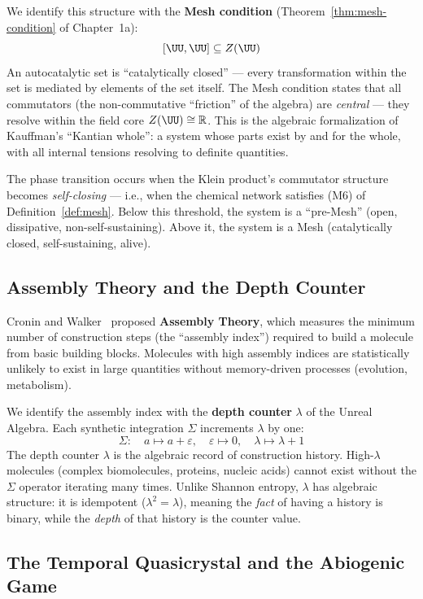 We identify this structure with the \textbf{Mesh condition} (Theorem~\ref{thm:mesh-condition} of Chapter~1a):
$$[\UU, \UU] \subseteq Z(\UU)$$
An autocatalytic set is ``catalytically closed'' --- every transformation within the set is mediated by elements of the set itself. The Mesh condition states that all commutators (the non-commutative ``friction'' of the algebra) are \emph{central} --- they resolve within the field core $Z(\UU) \cong \mathbb{R}$. This is the algebraic formalization of Kauffman's ``Kantian whole'': a system whose parts exist by and for the whole, with all internal tensions resolving to definite quantities.

The phase transition occurs when the Klein product's commutator structure becomes \emph{self-closing} --- i.e., when the chemical network satisfies (M6) of Definition~\ref{def:mesh}. Below this threshold, the system is a ``pre-Mesh'' (open, dissipative, non-self-sustaining). Above it, the system is a Mesh (catalytically closed, self-sustaining, alive).

\subsection{Assembly Theory and the Depth Counter}

Cronin and Walker~\cite{cronin2023} proposed \textbf{Assembly Theory}, which measures the minimum number of construction steps (the ``assembly index'') required to build a molecule from basic building blocks. Molecules with high assembly indices are statistically unlikely to exist in large quantities without memory-driven processes (evolution, metabolism).

We identify the assembly index with the \textbf{depth counter} $\lambda$ of the Unreal Algebra. Each synthetic integration $\Sigma$ increments $\lambda$ by one:
$$\Sigma: \quad a \mapsto a + \varepsilon, \quad \varepsilon \mapsto 0, \quad \lambda \mapsto \lambda + 1$$
The depth counter $\lambda$ is the algebraic record of construction history. High-$\lambda$ molecules (complex biomolecules, proteins, nucleic acids) cannot exist without the $\Sigma$ operator iterating many times. Unlike Shannon entropy, $\lambda$ has algebraic structure: it is idempotent ($\lambda^2 = \lambda$), meaning the \emph{fact} of having a history is binary, while the \emph{depth} of that history is the counter value.

\subsection{The Temporal Quasicrystal and the Abiogenic Game}

